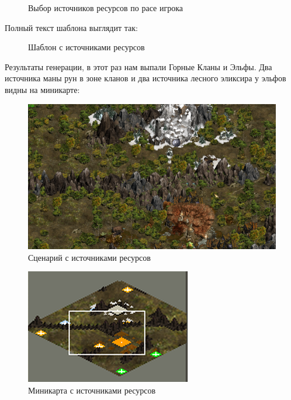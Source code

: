 \begin{figure}[H]

\caption{Выбор источников ресурсов по расе игрока}
\end{figure}

Полный текст шаблона выглядит так:

\begin{figure}[H]

\caption{Шаблон с источниками ресурсов}
\end{figure}

Результаты генерации, в этот раз нам выпали Горные Кланы и Эльфы. Два источника маны рун в зоне кланов и два источника лесного эликсира у эльфов видны на миникарте:

\begin{figure}[H]
\center
\includegraphics[width=1.0\linewidth]{docImages/scenarioWithMines2.png}
\caption{Сценарий с источниками ресурсов}
\end{figure}

\begin{figure}[H]
\center
\includegraphics[width=.48\linewidth]{docImages/scenarioMinimapWithMines2.png}
\caption{Миникарта с источниками ресурсов}
\end{figure}